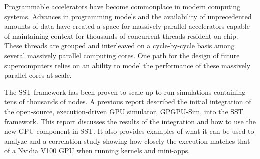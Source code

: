 Programmable accelerators have become commonplace in modern computing systems.
Advances in programming models and the availability of unprecedented amounts of data
have created a space for massively parallel accelerators capable of maintaining
context for thousands of concurrent threads resident on-chip. These threads are
grouped and interleaved on a cycle-by-cycle basis among several massively
parallel computing cores. One path for the design of future supercomputers
relies on an ability to model the performance of these massively parallel cores
at scale.

The SST framework has been proven to scale up to run simulations containing tens
of thousands of nodes. A previous report described the initial integration of
the open-source, execution-driven GPU simulator, GPGPU-Sim, into the SST
framework. This report discusses the results of the integration and how to use
the new GPU component in SST. It also provides examples of what it can be used
to analyze and a correlation study showing how closely the execution matches
that of a Nvidia V100 GPU when running kernels and mini-apps.
